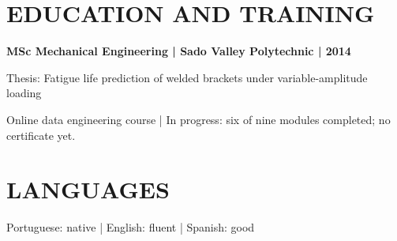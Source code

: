 \documentclass[11pt,a4paper]{article}
\newcommand{\cvsection}[1]{\Needspace{4\baselineskip}\section*{#1}}
\begin{document}
\cvsection{EDUCATION AND TRAINING}
\textbf{MSc Mechanical Engineering | Sado Valley Polytechnic | 2014}\par
Thesis: Fatigue life prediction of welded brackets under variable-amplitude loading\par
Online data engineering course | In progress: six of nine modules completed; no certificate yet.

\cvsection{LANGUAGES}
Portuguese: native | English: fluent | Spanish: good
\end{document}
